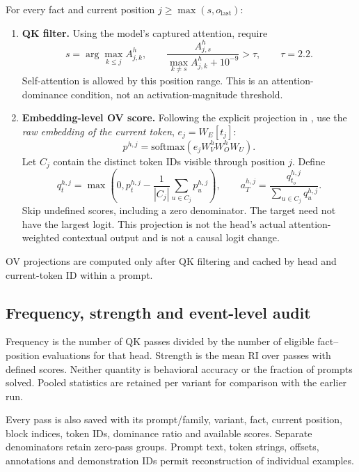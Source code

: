 For every fact and current position $j\ge\max(s,o_{\mathrm{last}})$:
\begin{enumerate}[itemsep=1pt]
\item \textbf{QK filter.} Using the model's captured attention, require
\begin{equation}
s=\arg\max_{k\le j} A^h_{j,k},\qquad
\frac{A^h_{j,s}}{\max_{k\ne s} A^h_{j,k}+10^{-9}}>\tau,\qquad \tau=2.2.
\end{equation}
Self-attention is allowed by this position range. This is an attention-dominance condition, not an activation-magnitude threshold.
\item \textbf{Embedding-level OV score.} Following the explicit projection in \cite{ren}, use the \emph{raw embedding of the current token}, $e_j=W_E[t_j]$:
\begin{equation}
p^{h,j}=\mathrm{softmax}(e_jW_V^hW_O^hW_U).
\end{equation}
Let $C_j$ contain the distinct token IDs visible through position $j$. Define
\begin{equation}
q_t^{h,j}=\max\left(0,p_t^{h,j}-\frac{1}{|C_j|}\sum_{u\in C_j}p_u^{h,j}\right),
\qquad a^{h,j}_{T}=\frac{q_{t_o}^{h,j}}{\sum_{u\in C_j}q_u^{h,j}}.
\end{equation}
Skip undefined scores, including a zero denominator. The target need not have the largest logit. This projection is not the head's actual attention-weighted contextual output and is not a causal logit change.
\end{enumerate}
OV projections are computed only after QK filtering and cached by head and current-token ID within a prompt.

\subsection{Frequency, strength and event-level audit}
Frequency is the number of QK passes divided by the number of eligible fact--position evaluations for that head. Strength is the mean RI over passes with defined scores. Neither quantity is behavioral accuracy or the fraction of prompts solved. Pooled statistics are retained per variant for comparison with the earlier run.

Every pass is also saved with its prompt/family, variant, fact, current position, block indices, token IDs, dominance ratio and available scores. Separate denominators retain zero-pass groups. Prompt text, token strings, offsets, annotations and demonstration IDs permit reconstruction of individual examples.

